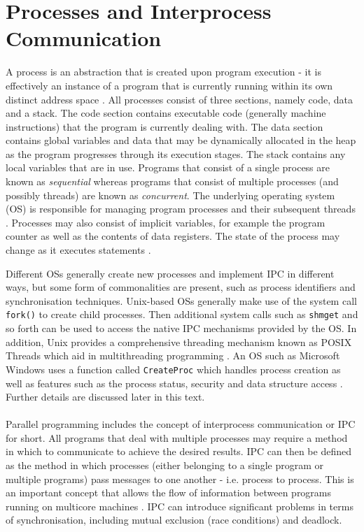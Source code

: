 \documentclass[12pt,a4paper,oneside]{article}
\def\code#1{\texttt{#1}}
\begin{document}
\section{Processes and Interprocess Communication}
\begin{spacing}{1.4}
A process is an abstraction that is created upon program execution - it is effectively an instance of a program that is currently running within its own distinct address space \citep{modernOS}. All processes consist of three sections, namely code, data and a stack. The code section contains executable code (generally machine instructions) that the program is currently dealing with. The data section contains global variables and data that may be dynamically allocated in the heap as the program progresses through its execution stages. The stack contains any local variables that are in use. Programs that consist of a single process are known as \textit{sequential} whereas programs that consist of multiple processes (and possibly threads) are known as \textit{concurrent}. The underlying operating system (OS) is responsible for managing program processes and their subsequent threads \citep{garg2005concurrent}. Processes may also consist of implicit variables, for example the program counter as well as the contents of data registers. The state of the process may change as it executes statements \citep{trainBook}.

Different OSs generally create new processes and implement IPC in different ways, but some form of commonalities are present, such as process identifiers and synchronisation techniques. Unix-based OSs generally make use of the system call \code{fork()} to create child processes. Then additional system calls such as \code{shmget} and so forth can be used to access the native IPC mechanisms provided by the OS. In addition, Unix provides a comprehensive threading mechanism known as POSIX Threads which aid in multithreading programming \citep{linuxKernal}. An OS such as Microsoft Windows uses a function called \code{CreateProc} which handles process creation as well as features such as the process status, security and data structure access \citep{modernOS}. Further details are discussed later in this text.
\\\\
Parallel programming includes the concept of interprocess communication or IPC for short. All programs that deal with multiple processes may require a method in which to communicate to achieve the desired results. IPC can then be defined as the method in which processes (either belonging to a single program or multiple programs) pass messages to one another - i.e. process to process. This is an important concept that allows the flow of information between programs running on multicore machines \citep{modernOS}. IPC can introduce significant problems in terms of synchronisation, including mutual exclusion (race conditions) and deadlock.


\end{spacing}
\end{document}
